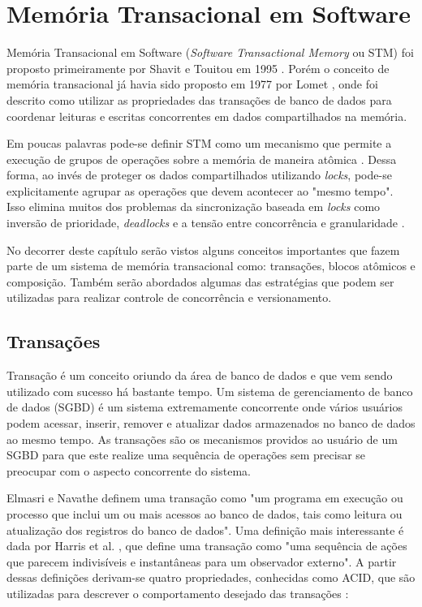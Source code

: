 \chapter{Memória Transacional em Software}

Memória Transacional em Software (\emph{Software Transactional Memory} ou STM) foi proposto primeiramente por Shavit e Touitou em 1995 \cite{shavit1995software}. Porém o conceito de memória transacional já havia sido proposto em 1977 por Lomet \cite{lomet1977process}, onde foi descrito como utilizar as propriedades das transações de banco de dados para coordenar leituras e escritas concorrentes em dados compartilhados na memória.

Em poucas palavras pode-se definir STM como um mecanismo que permite a execução de grupos de operações sobre a memória de maneira atômica \cite{harris2005composable}. Dessa forma, ao invés de proteger os dados compartilhados utilizando \emph{locks}, pode-se explicitamente agrupar as operações que devem acontecer ao "mesmo tempo". Isso elimina muitos dos problemas da sincronização baseada em \emph{locks} como inversão de prioridade, \emph{deadlocks} e a tensão entre concorrência e granularidade \cite{harris2005composable}.

No decorrer deste capítulo serão vistos alguns conceitos importantes que fazem parte de um sistema de memória transacional como: transações, blocos atômicos e composição. Também serão abordados algumas das estratégias que podem ser utilizadas para realizar controle de concorrência e versionamento.

\section{Transações}

Transação é um conceito oriundo da área de banco de dados e que vem sendo utilizado com sucesso há bastante tempo. Um sistema de gerenciamento de banco de dados (SGBD) é um sistema extremamente concorrente onde vários usuários podem acessar, inserir, remover e atualizar dados armazenados no banco de dados ao mesmo tempo. As transações são os mecanismos providos ao usuário de um SGBD para que este realize uma sequência de operações sem precisar se preocupar com o aspecto concorrente do sistema.

Elmasri e Navathe \cite{elmasri06db} definem uma transação como "um programa em execução ou processo que inclui um ou mais acessos ao banco de dados, tais como leitura ou atualização dos registros do banco de dados". Uma definição mais interessante é dada por Harris et al. \cite{harris2010transactional}, que define uma transação como "uma sequência de ações que parecem indivisíveis e instantâneas para um observador externo". A partir dessas definições derivam-se quatro propriedades, conhecidas como ACID, que são utilizadas para descrever o comportamento desejado das transações \cite{silberschatz1997database}:

